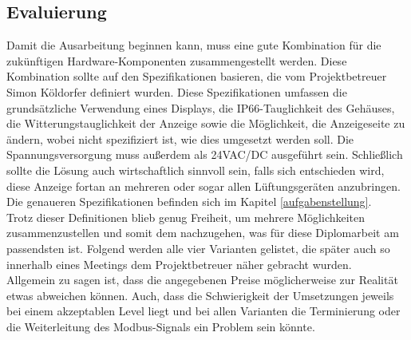 \subsection{Evaluierung} \label{evaluierung}
Damit die Ausarbeitung beginnen kann, muss eine gute Kombination für die zukünftigen Hardware-Komponenten zusammengestellt werden. Diese Kombination sollte auf den Spezifikationen basieren, die vom Projektbetreuer Simon Köldorfer definiert wurden. Diese Spezifikationen umfassen die grundsätzliche Verwendung eines Displays, die IP66-Tauglichkeit des Gehäuses, die Witterungstauglichkeit der Anzeige sowie die Möglichkeit, die Anzeigeseite zu ändern, wobei nicht spezifiziert ist, wie dies umgesetzt werden soll. Die Spannungsversorgung muss außerdem als 24VAC/DC ausgeführt sein. Schließlich sollte die Lösung auch wirtschaftlich sinnvoll sein, falls sich entschieden wird, diese Anzeige fortan an mehreren oder sogar allen Lüftungsgeräten anzubringen. Die genaueren Spezifikationen befinden sich im Kapitel \ref{aufgabenstellung}.\\
Trotz dieser Definitionen blieb genug Freiheit, um mehrere Möglichkeiten zusammenzustellen und somit dem nachzugehen, was für diese Diplomarbeit am passendsten ist. 
Folgend werden alle vier Varianten gelistet, die später auch so innerhalb eines Meetings dem Projektbetreuer näher gebracht wurden. \\
Allgemein zu sagen ist, dass die angegebenen Preise möglicherweise zur Realität etwas abweichen können. Auch, dass die Schwierigkeit der Umsetzungen jeweils bei einem akzeptablen Level liegt und bei allen Varianten die Terminierung oder die Weiterleitung des Modbus-Signals ein Problem sein könnte.
